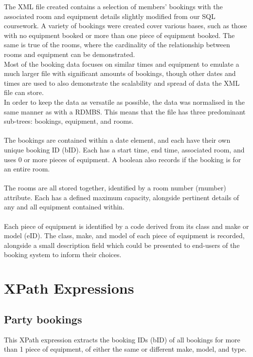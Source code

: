 \documentclass[a4paper, titlepage]{article}
\begin{document}
The XML file created contains a selection of members' bookings with the associated room and equipment details slightly modified from our SQL coursework. A variety of bookings were created cover various bases, such as those with no equipment booked or more than one piece of equipment booked. The same is true of the rooms, where the cardinality of the relationship between rooms and equipment can be demonstrated.
\\
Most of the booking data focuses on similar times and equipment to emulate a much larger file with significant amounts of bookings, though other dates and times are used to also demonstrate the scalability and spread of data the XML file can store.
\\
In order to keep the data as versatile as possible, the data was normalised in the same manner as with a RDMBS. This means that the file has three predominant sub-trees: bookings, equipment, and rooms.
\\
\\
The bookings are contained within a date element, and each have their own unique booking ID (bID). Each has a start time, end time, associated room, and uses 0 or more pieces of equipment. A boolean also records if the booking is for an entire room.
\\
\\
The rooms are all stored together, identified by a room number (rnumber) attribute. Each has a defined maximum capacity, alongside pertinent details of any and all equipment contained within.
\\
\\
Each piece of equipment is identified by a code derived from its class and make or model (eID). The class, make, and model of each piece of equipment is recorded, alongside a small description field which could be presented to end-users of the booking system to inform their choices. 

\section{XPath Expressions}
\subsection{Party bookings} \label{xpth:party}

This XPath expression extracts the booking IDs (bID) of all bookings for more than 1 piece of equipment, of either the same or different make, model, and type.
\end{document}
